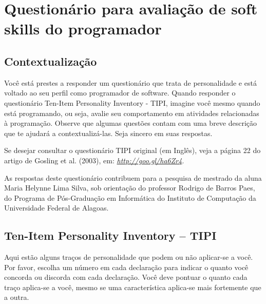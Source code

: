 \chapter{Questionário para avaliação de soft skills do programador}
\label{ap:tipi}




\section{Contextualização}

Você está prestes a responder um questionário que trata de personalidade e está voltado ao seu perfil como programador de software.
Quando responder o questionário Ten-Item Personality Inventory - TIPI, imagine você mesmo quando está programando, ou seja, avalie seu comportamento em atividades relacionadas à programação. Observe que algumas questões contam com uma breve descrição que te ajudará a contextualizá-las. Seja sincero em suas respostas.

Se desejar consultar o questionário TIPI original (em Inglês), veja a página 22 do artigo de Gosling et al. (2003)\nocite{gosling:03}, em:
\href{http://goo.gl/ha6Zr4}{\textsl{http://goo.gl/ha6Zr4}}.

As respostas deste questionário contribuem para a pesquisa de mestrado da aluna Maria Helynne Lima Silva, sob orientação do professor Rodrigo de Barros Paes, do Programa de Pós-Graduação em Informática do Instituto de Computação da Universidade Federal de Alagoas.

\section{Ten-Item Personality Inventory – TIPI}

Aqui estão alguns traços de personalidade que podem ou não aplicar-se a você.  Por favor, escolha um número em cada declaração para indicar o quanto você concorda ou discorda com cada declaração. Você deve pontuar o quanto cada traço aplica-se a você, mesmo se uma característica aplica-se mais fortemente que a outra.

